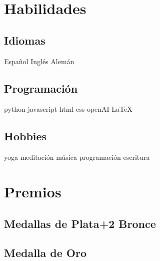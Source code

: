\documentclass[]{plushcv}
\begin{document}
\begin{minipage}[t]{0.25\textwidth} 


  
\section{Habilidades}


\sectionsep
\subsection{Idiomas}
\sectionsep
Español \textbullet{} Inglés \textbullet{} Alemán 
\sectionsep

\subsection{Programación}
\sectionsep
python \textbullet{} javascript  \textbullet{} html \textbullet{} css \textbullet{} openAI \textbullet{} \LaTeX
\sectionsep




\subsection{Hobbies}
\sectionsep
\sectionsep
yoga \textbullet{} meditación  \textbullet{} música \textbullet{} programación   \textbullet{}  escritura
\sectionsep



\section{Premios} 
\sectionsep
\subsection{Medallas de Plata+2 Bronce }

\sectionsep

\subsection{Medalla de Oro}
\sectionsep


\end{minipage}
\end{document}
